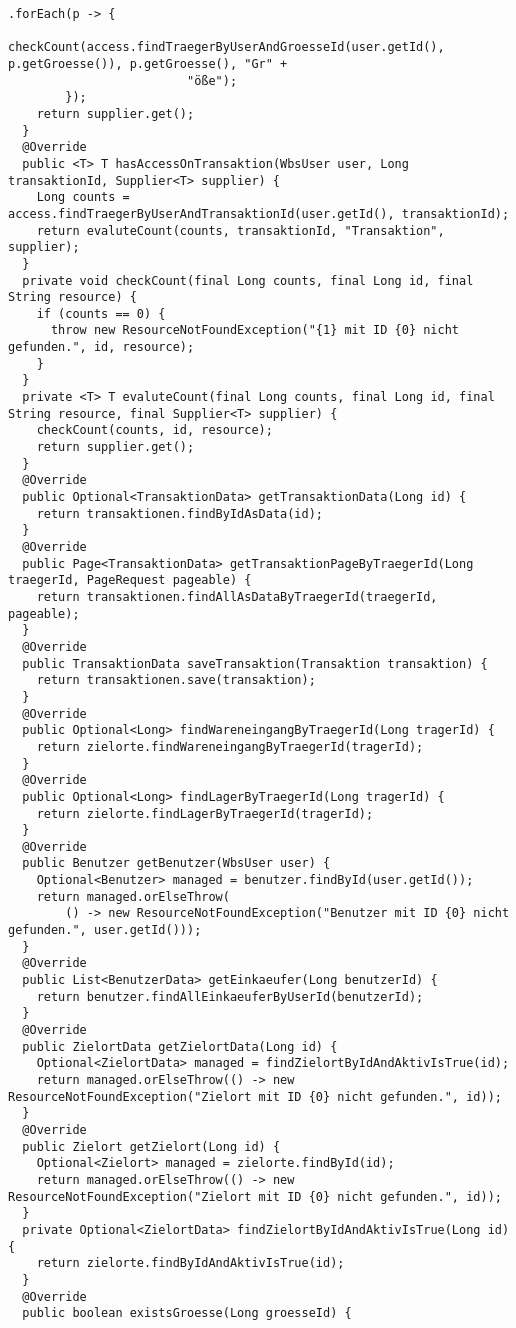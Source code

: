 \begin{lstlisting}[caption={Implementierung der Schnittstelle \code{TransaktionsDao} auf Seite von \code{repository}.}, label={lst:n_TransaktionDaoImpl}]
        .forEach(p -> {
          checkCount(access.findTraegerByUserAndGroesseId(user.getId(), p.getGroesse()), p.getGroesse(), "Gr" +
                         "öße");
        });
    return supplier.get();
  }
  @Override
  public <T> T hasAccessOnTransaktion(WbsUser user, Long transaktionId, Supplier<T> supplier) {
    Long counts = access.findTraegerByUserAndTransaktionId(user.getId(), transaktionId);
    return evaluteCount(counts, transaktionId, "Transaktion", supplier);
  }
  private void checkCount(final Long counts, final Long id, final String resource) {
    if (counts == 0) {
      throw new ResourceNotFoundException("{1} mit ID {0} nicht gefunden.", id, resource);
    }
  }
  private <T> T evaluteCount(final Long counts, final Long id, final String resource, final Supplier<T> supplier) {
    checkCount(counts, id, resource);
    return supplier.get();
  }
  @Override
  public Optional<TransaktionData> getTransaktionData(Long id) {
    return transaktionen.findByIdAsData(id);
  }
  @Override
  public Page<TransaktionData> getTransaktionPageByTraegerId(Long traegerId, PageRequest pageable) {
    return transaktionen.findAllAsDataByTraegerId(traegerId, pageable);
  }
  @Override
  public TransaktionData saveTransaktion(Transaktion transaktion) {
    return transaktionen.save(transaktion);
  }
  @Override
  public Optional<Long> findWareneingangByTraegerId(Long tragerId) {
    return zielorte.findWareneingangByTraegerId(tragerId);
  }
  @Override
  public Optional<Long> findLagerByTraegerId(Long tragerId) {
    return zielorte.findLagerByTraegerId(tragerId);
  }
  @Override
  public Benutzer getBenutzer(WbsUser user) {
    Optional<Benutzer> managed = benutzer.findById(user.getId());
    return managed.orElseThrow(
        () -> new ResourceNotFoundException("Benutzer mit ID {0} nicht gefunden.", user.getId()));
  }
  @Override
  public List<BenutzerData> getEinkaeufer(Long benutzerId) {
    return benutzer.findAllEinkaeuferByUserId(benutzerId);
  }
  @Override
  public ZielortData getZielortData(Long id) {
    Optional<ZielortData> managed = findZielortByIdAndAktivIsTrue(id);
    return managed.orElseThrow(() -> new ResourceNotFoundException("Zielort mit ID {0} nicht gefunden.", id));
  }
  @Override
  public Zielort getZielort(Long id) {
    Optional<Zielort> managed = zielorte.findById(id);
    return managed.orElseThrow(() -> new ResourceNotFoundException("Zielort mit ID {0} nicht gefunden.", id));
  }
  private Optional<ZielortData> findZielortByIdAndAktivIsTrue(Long id) {
    return zielorte.findByIdAndAktivIsTrue(id);
  }
  @Override
  public boolean existsGroesse(Long groesseId) {

\end{lstlisting}

